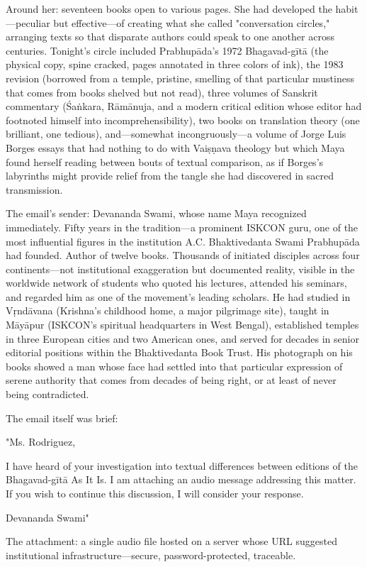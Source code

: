 \documentclass[12pt,twoside]{book}
\begin{document}
Around her: seventeen books open to various pages. She had developed the habit—peculiar but effective—of creating what she called "conversation circles," arranging texts so that disparate authors could speak to one another across centuries. Tonight's circle included Prabhupāda's 1972 Bhagavad-gītā (the physical copy, spine cracked, pages annotated in three colors of ink), the 1983 revision (borrowed from a temple, pristine, smelling of that particular mustiness that comes from books shelved but not read), three volumes of Sanskrit commentary (Śaṅkara, Rāmānuja, and a modern critical edition whose editor had footnoted himself into incomprehensibility), two books on translation theory (one brilliant, one tedious), and—somewhat incongruously—a volume of Jorge Luis Borges essays that had nothing to do with Vaiṣṇava theology but which Maya found herself reading between bouts of textual comparison, as if Borges's labyrinths might provide relief from the tangle she had discovered in sacred transmission.

The email's sender: Devananda Swami, whose name Maya recognized immediately. Fifty years in the tradition—a prominent ISKCON guru, one of the most influential figures in the institution A.C. Bhaktivedanta Swami Prabhupāda had founded. Author of twelve books. Thousands of initiated disciples across four continents—not institutional exaggeration but documented reality, visible in the worldwide network of students who quoted his lectures, attended his seminars, and regarded him as one of the movement's leading scholars. He had studied in Vṛndāvana (Krishna's childhood home, a major pilgrimage site), taught in Māyāpur (ISKCON's spiritual headquarters in West Bengal), established temples in three European cities and two American ones, and served for decades in senior editorial positions within the Bhaktivedanta Book Trust. His photograph on his books showed a man whose face had settled into that particular expression of serene authority that comes from decades of being right, or at least of never being contradicted.

The email itself was brief:

"Ms. Rodriguez,

I have heard of your investigation into textual differences between editions of the Bhagavad-gītā As It Is. I am attaching an audio message addressing this matter. If you wish to continue this discussion, I will consider your response.

Devananda Swami"

The attachment: a single audio file hosted on a server whose URL suggested institutional infrastructure—secure, password-protected, traceable.
\end{document}

